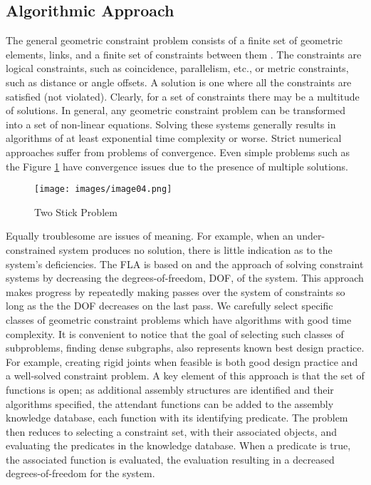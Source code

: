 \documentclass[]{report}
\begin{document}
\subsection{Algorithmic Approach}

The general geometric constraint problem consists of a finite set 
of geometric elements, links, and  a finite set of constraints between them \citep{hoffmann1998gcd}.  
The constraints are logical constraints, such as coincidence, parallelism, etc., 
or metric constraints, such as distance or angle offsets. 
A solution is one where all the constraints are satisfied (not violated). 
Clearly, for a set of constraints there may be a multitude of solutions. 
In general, any geometric constraint problem can be transformed into a set of non-linear equations. 
Solving these systems generally results in algorithms of 
at least exponential time complexity \citep{hoffmann1998gcd} or worse. 
Strict numerical approaches suffer from problems of convergence.  
Even simple problems such as the Figure \ref{fig:two-stick-problem} \citep{kramer1991sgcs}
have convergence issues due to the presence of multiple solutions. 

\begin{figure}[h!]
	\centering
	\texttt{[image: images/image04.png]}
	\caption{Two Stick Problem}
	\label{fig:two-stick-problem}
\end{figure}

Equally troublesome are issues of meaning. 
For example, when an under-constrained system produces no solution, 
there is little indication as to the system's deficiencies.
The FLA is based on \citep{kramer1991sgcs} and the approach of solving constraint 
systems by decreasing the degrees-of-freedom, DOF, of the system.  
This approach makes progress by repeatedly making passes over the 
system of constraints so long as the the DOF decreases on the last pass. 
We carefully select specific classes of geometric constraint problems 
which have algorithms with good time complexity. 
It is convenient to notice that the  goal of selecting such 
classes of subproblems, finding dense subgraphs, also represents known best design practice. 
For example, creating rigid joints when feasible is both good design practice 
and a well-solved constraint problem. A key element of this approach 
is that the set of functions is open; 
as additional assembly structures are identified and their 
algorithms specified, the attendant functions can be added 
to the assembly knowledge database, each function with its identifying predicate. 
The problem then reduces to selecting a constraint set, 
with their associated objects, and evaluating the predicates in the knowledge database. 
When a predicate is true, the associated function is evaluated, 
the evaluation resulting in a decreased degrees-of-freedom for the system.  
\end{document}
